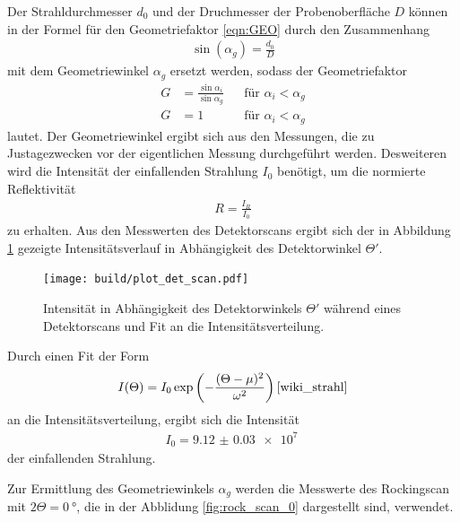 Der Strahldurchmesser $d_0$ und der Druchmesser der Probenoberfläche $D$ können in der Formel für den Geometriefaktor \eqref{eqn:GEO}
durch den Zusammenhang
\begin{align}
   \sin(\alpha_g) = \frac{d_0}{D}
\end{align}
mit dem Geometriewinkel $\alpha_g$ ersetzt werden, sodass der Geometriefaktor
\begin{align}
  G&=\frac{\sin\alpha_i}{\sin\alpha_g} &  &\text{für } \alpha_i<\alpha_g \label{eqn:GEO_neu}\\
  G&=1 & &\text{für } \alpha_i<\alpha_g
\end{align}
lautet.
Der Geometriewinkel ergibt sich aus den Messungen, die zu Justagezwecken vor der eigentlichen Messung durchgeführt werden.
Desweiteren wird die Intensität der einfallenden Strahlung $I_0$ benötigt, um die normierte Reflektivität
\begin{align}
  R=\frac{I_R}{I_0}
\end{align}
zu erhalten.
Aus den Messwerten des Detektorscans ergibt sich der in Abbildung \ref{fig:det_scan}
gezeigte Intensitätsverlauf in Abhängigkeit des Detektorwinkel $\Theta'$.

\begin{figure}
  \centering
  \texttt{[image: build/plot\_det\_scan.pdf]}
  \caption{Intensität in Abhängigkeit des Detektorwinkels $\Theta'$ während eines Detektorscans und Fit an die Intensitätsverteilung.}
  \label{fig:det_scan}
\end{figure}

Durch einen Fit der Form
\begin{align}
  I(\Theta) =  I_0 \exp\left(-\frac{(\Theta-\mu)^2}{\omega^2}\right) \text{\cite{wiki_strahl}}
\end{align}
an die Intensitätsverteilung, ergibt sich die Intensität
\begin{align}
  I_0 = \SI{9.12(3)e7}{}
  \label{eqn:I_0}
\end{align}
der einfallenden Strahlung.

Zur Ermittlung des Geometriewinkels  $\alpha_g$ werden die Messwerte
des Rockingscan mit $2\Theta = \SI{0}{\degree}$, die in der Abblidung \ref{fig:rock_scan_0}
dargestellt sind, verwendet.


